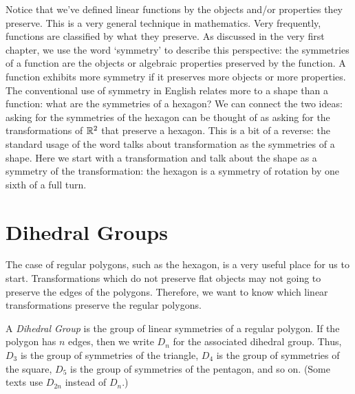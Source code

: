 \documentclass[fleqn]{report}
\begin{document}
Notice that we've defined linear functions by the objects
and/or properties they preserve. This is a very general
technique in mathematics. Very frequently, functions are
classified by what they preserve. As discussed in the very
first chapter, we use the word `symmetry' to describe this
perspective: the symmetries of a function are the objects or
algebraic properties preserved by the function. A function
exhibits more symmetry if it preserves more objects or more
properties. The conventional use of symmetry in English
relates more to a shape than a function: what are the
symmetries of a hexagon? We can connect the two ideas: asking
for the symmetries of the hexagon can be thought of as asking
for the transformations of $\mathbb{R}^2$ that preserve a hexagon.
This is a bit of a reverse: the standard usage of the word
talks about transformation as the symmetries of a shape. Here
we start with a transformation and talk about the shape as a
symmetry of the transformation: the hexagon is a symmetry of
rotation by one sixth of a full turn.

\section{Dihedral Groups}

The case of regular polygons, such as the hexagon, is a very
useful place for us to start. Transformations which do not
preserve flat objects may not going to preserve the edges of
the polygons. Therefore, we want to know which linear
transformations preserve the regular polygons. 

\begin{defn}
A \emph{Dihedral Group} is the group of linear symmetries of a
regular polygon. If the polygon has $n$ edges, then we write
$D_n$ for the associated dihedral group. Thus, $D_3$ is the
group of symmetries of the triangle, $D_4$ is the group of
symmetries of the square, $D_5$ is the group of symmetries of
the pentagon, and so on. (Some texts use $D_{2n}$ instead of
$D_n$.)
\end{defn}
\end{document}
